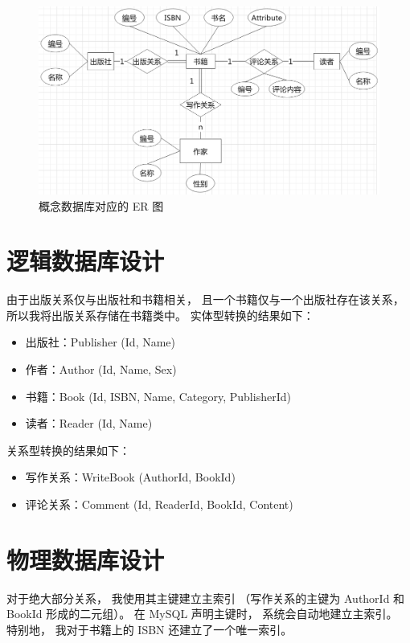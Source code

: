\documentclass[12pt,onecolumn]{report}
\theoremstyle{plain}
\numberwithin{figure}{chapter}
\numberwithin{table}{chapter}
\numberwithin{lstlisting}{chapter}
\begin{document}
\begin{figure}[ht]
  \centering
  \includegraphics[width=\linewidth]{figures/er.png}
  \caption{概念数据库对应的 ER 图}\label{fig:ER-fig}
\end{figure}

\section{逻辑数据库设计}
由于出版关系仅与出版社和书籍相关，
且一个书籍仅与一个出版社存在该关系，
所以我将出版关系存储在书籍类中。
实体型转换的结果如下：
\begin{itemize}[fullwidth,itemindent=\parindent]
\item 出版社：Publisher (Id, Name)
\item 作者：Author (Id, Name, Sex)
\item 书籍：Book (Id, ISBN, Name, Category, PublisherId)
\item 读者：Reader (Id, Name)
\end{itemize}

关系型转换的结果如下：
\begin{itemize}[fullwidth,itemindent=\parindent]
\item 写作关系：WriteBook (AuthorId, BookId)
\item 评论关系：Comment (Id, ReaderId, BookId, Content)
\end{itemize}

\section{物理数据库设计}
对于绝大部分关系，
我使用其主键建立主索引
（写作关系的主键为 AuthorId 和 BookId 形成的二元组）。
在 MySQL 声明主键时，
系统会自动地建立主索引。
特别地，
我对于书籍上的 ISBN 还建立了一个唯一索引。
\end{document}
